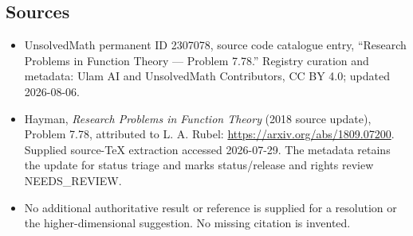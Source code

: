\documentclass[11pt]{article}
\begin{document}
\subsection{Sources}
\begin{itemize}
\item UnsolvedMath permanent ID 2307078, source code catalogue entry, ``Research Problems in Function Theory --- Problem 7.78.'' Registry curation and metadata: Ulam AI and UnsolvedMath Contributors, CC BY 4.0; updated 2026-08-06.
\item Hayman, \emph{Research Problems in Function Theory} (2018 source update), Problem 7.78, attributed to L. A. Rubel: \url{https://arxiv.org/abs/1809.07200}. Supplied source-TeX extraction accessed 2026-07-29. The metadata retains the update for status triage and marks status/release and rights review NEEDS\_REVIEW.
\item No additional authoritative result or reference is supplied for a resolution or the higher-dimensional suggestion. No missing citation is invented.
\end{itemize}
\end{document}
